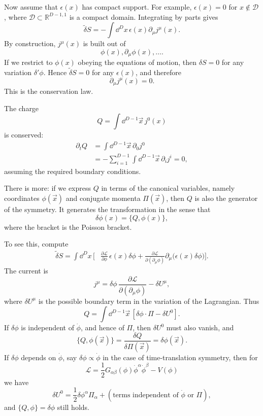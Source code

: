 Now assume that \(\epsilon(x)\) has compact support. For example,
\(\epsilon(x)=0\) for \(x\notin\mathcal D\), where
\(\mathcal D\subset\mathbb R^{D-1,1}\) is a compact domain. Integrating by
parts gives
\[
  \widetilde{\delta}S
  =
  -\int\dd^Dx\,\epsilon(x)\partial_\mu j^\mu(x).
\]
By construction, \(j^\mu(x)\) is built out of
\[
  \phi(x),\partial_\mu\phi(x),\ldots .
\]
If we restrict to \(\phi(x)\) obeying the equations of motion, then
\(\delta S=0\) for any variation \(\delta'\phi\). Hence
\(\widetilde{\delta}S=0\) for any \(\epsilon(x)\), and therefore
\[
  \partial_\mu j^\mu(x)=0.
\]
This is the conservation law.

The charge
\[
  Q=\int\dd^{D-1}\vec x\,j^0(x)
\]
is conserved:
\[
\begin{aligned}
  \partial_t Q
  &=
  \int\dd^{D-1}\vec x\,\partial_0 j^0  \\
  &=
  -\sum_{i=1}^{D-1}
  \int\dd^{D-1}\vec x\,\partial_i j^i
  =
  0,
\end{aligned}
\]
assuming the required boundary conditions.

There is more: if we express \(Q\) in terms of the canonical variables, namely
coordinates \(\phi(\vec x)\) and conjugate momenta \(\Pi(\vec x)\), then \(Q\)
is also the generator of the symmetry. It generates the transformation in the
sense that
\[
  \delta\phi(x)=\{Q,\phi(x)\},
\]
where the bracket is the Poisson bracket.

To see this, compute
\[
\begin{aligned}
  \widetilde{\delta}S
  =
  \int\dd^Dx\,\Bigg[
  &\frac{\partial\mathcal L}{\partial\phi}\,
    \epsilon(x)\delta\phi
  +
  \frac{\partial\mathcal L}{\partial(\partial_\mu\phi)}
  \partial_\mu\bigl(\epsilon(x)\delta\phi\bigr)
  \Bigg].
\end{aligned}
\]
The current is
\[
  j^\mu
  =
  \delta\phi\,
  \frac{\partial\mathcal L}{\partial(\partial_\mu\phi)}
  -\delta U^\mu,
\]
where \(\delta U^\mu\) is the possible boundary term in the variation of the
Lagrangian. Thus
\[
  Q
  =
  \int\dd^{D-1}\vec x\,
  \left[
    \delta\phi\cdot\Pi-\delta U^0
  \right].
\]
If \(\delta\phi\) is independent of \(\dot\phi\), and hence of \(\Pi\), then
\(\delta U^0\) must also vanish, and
\[
  \{Q,\phi(\vec x)\}
  =
  \frac{\delta Q}{\delta\Pi(\vec x)}
  =
  \delta\phi(\vec x).
\]
If \(\delta\phi\) depends on \(\dot\phi\), say
\(\delta\phi\propto\dot\phi\) in the case of time-translation symmetry, then
for
\[
  \mathcal L
  =
  \frac12G_{\alpha\beta}(\phi)\dot\phi^\alpha\dot\phi^\beta
  -V(\phi)
\]
we have
\[
  \delta U^0
  =
  \frac12\delta\phi^\alpha\Pi_\alpha
  +(\text{terms independent of }\dot\phi\text{ or }\Pi),
\]
and \(\{Q,\phi\}=\delta\phi\) still holds.

